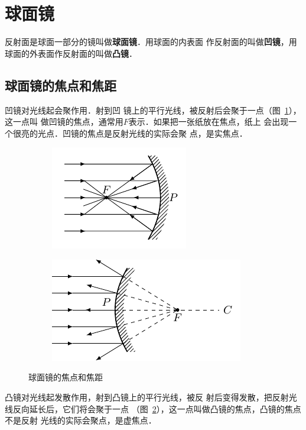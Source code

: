 \section{球面镜}
反射面是球面一部分的镜叫做\textbf{球面镜}．用球面的内表面
作反射面的叫做\textbf{凹镜}，用球面的外表面作反射面的叫做\textbf{凸镜}．

\subsection{球面镜的焦点和焦距}

凹镜对光线起会聚作用．射到凹
镜上的平行光线，被反射后会聚于一点（图~\ref{fig_C_5-14a}），这一点叫
做凹镜的焦点，通常用$F$表示．如果把一张纸放在焦点，纸上
会出现一个很亮的光点．凹镜的焦点是反射光线的实际会聚
点，是实焦点．
\begin{figure}[htbp]
    \centering
    \begin{subfigure}{0.4\linewidth}
        \centering
        \includegraphics{fig/C/5-14a.pdf}
        \caption{}\label{fig_C_5-14a}
    \end{subfigure}
    \hfil
    \begin{subfigure}{0.4\linewidth}
        \centering
        \includegraphics{fig/C/5-14b.pdf}
        \caption{}\label{fig_C_5-14b}
    \end{subfigure}
    \caption{球面镜的焦点和焦距}\label{fig_C_5-14}
\end{figure}

凸镜对光线起发散作用，射到凸镜上的平行光线，被反
射后变得发散，把反射光线反向延长后，它们将会聚于一点
（图~\ref{fig_C_5-14b}），这一点叫做凸镜的焦点，凸镜的焦点不是反射
光线的实际会聚点，是虚焦点．

